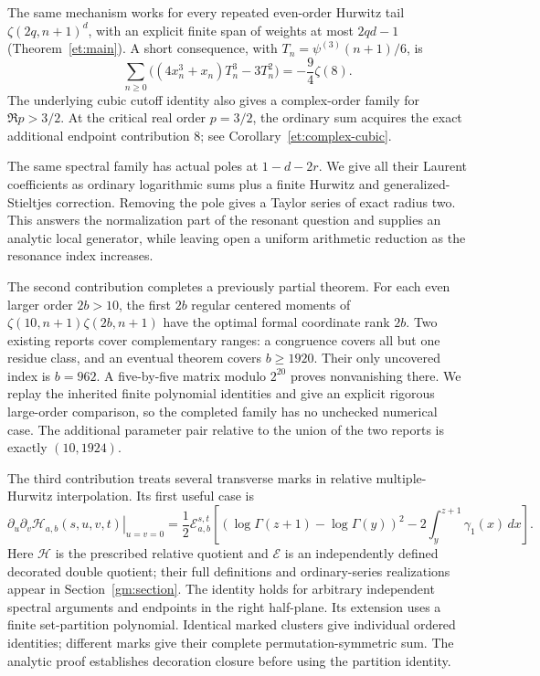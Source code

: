 The same mechanism works for every repeated even-order Hurwitz tail
\(\zeta(2q,n+1)^d\), with an explicit finite span of weights at most
$2qd-1$ (Theorem~\ref{et:main}). A short consequence, with
$T_n=\psi^{(3)}(n+1)/6$, is
\[
 \sum_{n\ge0}\bigl((4x_n^3+x_n)T_n^3-3T_n^2\bigr)
                                      =-\frac94\zeta(8).
\]
The underlying cubic cutoff identity also gives a complex-order family
for $\Re p>3/2$. At the critical real order $p=3/2$, the ordinary
sum acquires the exact additional endpoint contribution $8$;
see Corollary~\ref{et:complex-cubic}.

The same spectral family has actual poles at $1-d-2r$. We give all their
Laurent coefficients as ordinary logarithmic sums plus a finite Hurwitz
and generalized-Stieltjes correction. Removing the pole gives a Taylor
series of exact radius two. This answers the normalization part of the
resonant question and supplies an analytic local generator, while leaving
open a uniform arithmetic reduction as the resonance index increases.

The second contribution completes a previously partial theorem. For
each even larger order $2b>10$, the first $2b$ regular centered moments
of $\zeta(10,n+1)\zeta(2b,n+1)$ have the optimal formal coordinate
rank $2b$. Two existing reports cover complementary ranges: a congruence
covers all but one residue class, and an eventual theorem covers
$b\ge1920$. Their only uncovered index is $b=962$. A five-by-five
matrix modulo $2^{20}$ proves nonvanishing there. We replay the inherited
finite polynomial identities and give an explicit rigorous large-order
comparison, so the completed family has no unchecked numerical case.
The additional parameter pair relative to the union of the two reports
is exactly $(10,1924)$.

The third contribution treats several transverse marks in relative
multiple-Hurwitz interpolation. Its first useful case is
\begin{equation}\label{intro:gamma}
\left.\partial_u\partial_v\mathcal H_{a,b}(s,u,v,t)\right|_{u=v=0}
=\frac12\mathcal E_{a,b}^{s,t}\!\left[
 (\log\Gamma(z+1)-\log\Gamma(y))^2
                  -2\int_y^{z+1}\gamma_1(x)\,dx\right].
\end{equation}
Here $\mathcal H$ is the prescribed relative quotient and $\mathcal E$
is an independently defined decorated double quotient; their full
definitions and ordinary-series realizations appear in
Section~\ref{gm:section}. The identity holds for arbitrary independent
spectral arguments and endpoints in the right half-plane. Its extension
uses a finite set-partition polynomial. Identical marked clusters give
individual ordered identities; different marks give their complete
permutation-symmetric sum. The analytic proof establishes decoration
closure before using the partition identity.

